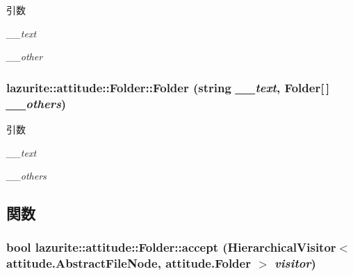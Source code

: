 \begin{DoxyParams}{引数}
\item[{\em \_\-\_\-text}]\item[{\em \_\-\_\-other}]\end{DoxyParams}
\hypertarget{classlazurite_1_1attitude_1_1_folder_a969647ad9d017d51b39728e301edb718}{
\subsubsection[{Folder}]{\setlength{\rightskip}{0pt plus 5cm}lazurite::attitude::Folder::Folder (string {\em \_\-\_\-text}, \/  {\bf Folder}\mbox{[}$\,$\mbox{]} {\em \_\-\_\-others})}}
\label{classlazurite_1_1attitude_1_1_folder_a969647ad9d017d51b39728e301edb718}

\begin{DoxyParams}{引数}
\item[{\em \_\-\_\-text}]\item[{\em \_\-\_\-others}]\end{DoxyParams}


\subsection{関数}
\hypertarget{classlazurite_1_1attitude_1_1_folder_ade81cb2a61c31230f4436781a7882e7a}{
\subsubsection[{accept}]{\setlength{\rightskip}{0pt plus 5cm}bool lazurite::attitude::Folder::accept (HierarchicalVisitor$<$ {\bf attitude.AbstractFileNode}, {\bf attitude.Folder} $>$ {\em visitor})}}
\label{classlazurite_1_1attitude_1_1_folder_ade81cb2a61c31230f4436781a7882e7a}

